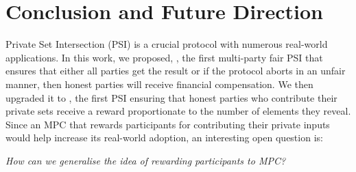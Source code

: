 
\vspace{-2mm}
\section{Conclusion and Future Direction}\label{sec::concl}


Private Set Intersection (PSI) is a crucial protocol with numerous real-world applications. In this work, we proposed, \withFai, the first multi-party fair PSI that ensures that either all parties get the result or if the protocol aborts in an unfair manner, then honest parties will receive financial compensation. We then upgraded it to \withRew, the first PSI ensuring that honest parties who contribute their private sets receive a reward proportionate to the number of elements they reveal. Since an MPC that rewards participants for contributing their private inputs would help increase its real-world adoption, an interesting open question is:
%
\begin{center}
%
 \emph{How can we generalise the idea of rewarding participants to MPC?}
 \end{center}